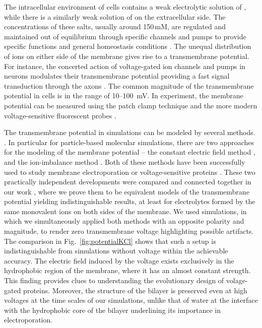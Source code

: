 The intracellular environment of cells contains a weak electrolytic solution of , 
while there is a similarly weak solution of  on the extracellular side. 
The concentrations of these salts, usually around 150\,mM, 
are regulated and maintained out of equilibrium through specific channels and pumps 
to provide specific functions and general homeostasis conditions \citep{Bezanilla2008, Knudsen_book2002}. 
The unequal distribution of ions on either side of the membrane
gives rise to a transmembrane potential. 
For instance, the concerted action of voltage-gated ion channels and pumps in neurons 
modulates their transmembrane potential
providing a fast signal transduction through the axons \citep{Knudsen_book2002, Storace2015, Sung2015}. 
The common magnitude of the transmembrane potential in cells is in the range of 10--100~mV. 
In experiment, the membrane potential can be measured using the patch clamp technique \citep{Bezanilla2008}
and the more modern voltage-sensitive fluorescent probes \citep{Storace2015, Sung2015}. 

The transmembrane potential in simulations can be modeled by several methods. \citep{Tieleman2001,Sin2015, Roux1997, sachs04_potential}.
In particular for particle-based molecular simulations, 
there are two approaches for the modeling of the membrane potential --
 the constant electric field method \citep{Roux1997,Roux2008,Gumbart2012}, 
and
 the ion-imbalance method \citep{sachs04_potential,Delemotte2008}. 
Both of these methods have been successfully used to study membrane electroporation or voltage-sensitive proteins \citep{Vargas2012, bockmann_kinetics_2008, gumbart_constant_2012, kutzner_computational_2011, casciola_molecular_2014}. 
These two practically independent developments were compared and connected together in our work \citep{melcr16},
where we prove them to be equivalent models of the transmembrane potential yielding indistinguishable results, 
at least for electrolytes formed by the same monovalent ions on both sides of the membrane. 
We used simulations, 
in which we simultaneously applied both methods
with an opposite polarity and magnitude, 
to render zero transmembrane voltage
highlighting possible artifacts. 
The comparison in Fig.~\ref{fig:potentialKCl} shows 
that such a setup is indistinguishable 
from simulations without voltage within the achievable accuracy. 
The electric field induced by the voltage 
exists exclusively in the hydrophobic region of the membrane,
where it has an almost constant strength. 
This finding provides clues to understanding the evolutionary design of volage-gated proteins. \citep{Vargas2012} 
Moreover,
the structure of the bilayer is preserved even at high voltages at the time scales of our simulations,
unlike that of water at the interface with the hydrophobic core of the bilayer
underlining its importance in electroporation. \citep{bu2017mechanics}

